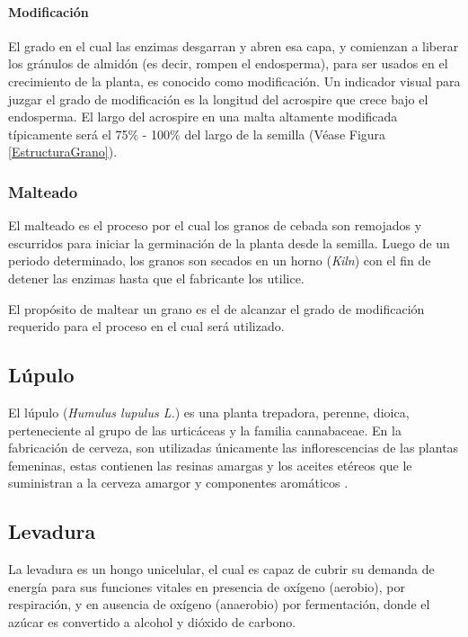     	        \paragraph{Modificación}
    	        El grado en el cual las enzimas desgarran y abren esa capa, y comienzan a liberar los gránulos de almidón (es decir, rompen el endosperma), para ser usados en el crecimiento de la planta, es conocido como modificación. Un indicador visual para juzgar el grado de modificación es la longitud del acrospire que crece bajo el endosperma. El largo del acrospire en una malta altamente modificada típicamente será el 75\% - 100\% del largo de la semilla (Véase Figura \ref{EstructuraGrano}). 
    	    \subsubsection{Malteado}
    	        \par El malteado es el proceso por el cual los granos de cebada son remojados y escurridos para iniciar la germinación de la planta desde la semilla. Luego de un periodo determinado, los granos son secados en un horno (\textit{Kiln}) con el fin de detener las enzimas hasta que el fabricante los utilice.
    	        
    	        \par El propósito de maltear un grano es el de alcanzar el grado de modificación requerido para el proceso en el cual será utilizado.
    	   
        \subsection{Lúpulo}
            \par El lúpulo (\textit{Humulus lupulus  L.}) es una planta trepadora, perenne, dioica, perteneciente al grupo de las urticáceas y la familia cannabaceae. En la fabricación de cerveza, son utilizadas únicamente las inflorescencias de las plantas femeninas, estas contienen las resinas amargas y los aceites etéreos que le suministran a la cerveza amargor y componentes aromáticos \cite{Kunze}.
            
        \subsection{Levadura}
            \par La levadura es un hongo unicelular, el cual es capaz de cubrir su demanda de energía para sus funciones vitales en presencia de oxígeno (aerobio), por respiración, y en ausencia de oxígeno (anaerobio) por fermentación, donde el azúcar es convertido a alcohol y dióxido de carbono.
            
